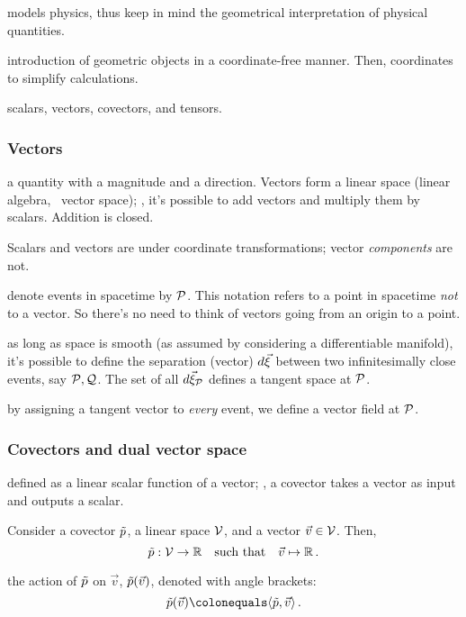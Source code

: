  models physics, thus keep in mind the geometrical interpretation of physical quantities.

 introduction of geometric objects in a coordinate-free manner. Then, coordinates to simplify calculations.

 scalars, vectors, covectors, and tensors.


\subsubsection{Vectors}
%
 a quantity with a magnitude and a direction. Vectors form a linear space (linear algebra, \aka\ vector space); \ie, it's possible to add vectors and multiply them by scalars. Addition is closed.

Scalars and vectors are  under coordinate transformations; vector \emph{components} are not.

 denote events in spacetime by $\mathcal{P}$. This notation refers to a point in spacetime \emph{not} to a vector. So there's no need to think of vectors going from an origin to a point.

 as long as space is smooth (as assumed by considering a differentiable manifold), it's possible to define the separation (vector) $d\vec{\xi}$ between two infinitesimally close events, say $\mathcal{P},\mathcal{Q}$. The set of all $d\vec{\xi}_{\mathcal{P}}$ defines a tangent space at $\mathcal{P}$. 

 by assigning a tangent vector to \emph{every} event, we define a vector field at $\mathcal{P}$.


\subsubsection{Covectors and dual vector space}
%
 defined as a linear scalar function of a vector; \ie, a covector takes a vector as input and outputs a scalar. 

Consider a covector $\tilde{p}$, a linear space $\mathcal{V}$, and a vector $\vec v\in\mathcal{V}$. Then, 
%
\begin{equation*}
  {\tilde{p}}:{\mathcal{V}}\to{\mathbb{R}}\quad\text{such that}\quad{\vec v}\mapsto{\mathbb{R}}\,.
\end{equation*}

 the action of $\tilde{p}$ on $\vec v$, $\cov p\vat{\vec v}$, denoted with angle brackets:
%
\begin{equation}\label{eq:scalarproductcovectoronvector}
  \cov p\vat{\vec v} \defas \sprod{\cov p}{\vec v}\,.
\end{equation}

